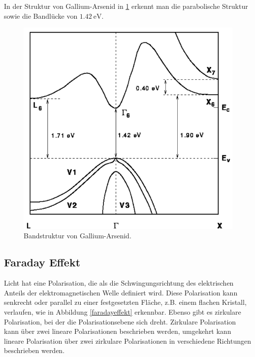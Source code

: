 In der Struktur von Gallium-Arsenid in \ref{fig:gaas} erkennt man die parabolische Struktur sowie die Bandlücke von $\qty{1.42}{\electronvolt}$.
\begin{figure}[H]
    \centering
    \includegraphics[width=\textwidth]{Bilder/gaas.png}
    \caption{Bandstruktur von Gallium-Arsenid. \cite{gaas}}
    \label{fig:gaas}
\end{figure}


\subsection{Faraday Effekt}

Licht hat eine Polarisation, die als die Schwingungsrichtung des elektrischen Anteils der elektromagnetischen Welle definiert wird. Diese Polarisation kann senkrecht oder parallel zu einer festgesetzten Fläche,
z.B. einem flachen Kristall, verlaufen, wie in Abbildung \ref{faradayeffekt}
erkennbar. Ebenso gibt es zirkulare Polarisation, bei der die Polarisationsebene sich dreht. Zirkulare Polarisation kann über zwei lineare Polarisationen beschrieben werden, umgekehrt kann lineare Polarisation über zwei zirkulare
Polarisationen in verschiedene Richtungen beschrieben werden. \\

